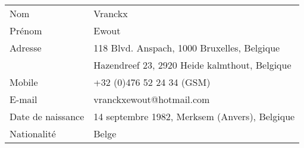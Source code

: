 \documentclass[10pt]{report}
\begin{document}
\pagestyle{headings}
\thispagestyle{empty}

\ \newline







		
\begin{tabular}[t]{ll}

Nom & Vranckx\\[1ex]
Pr\'{e}nom & Ewout\\[1ex]
Adresse & 118 Blvd. Anspach, 1000 Bruxelles, Belgique\\[1ex]
& Hazendreef 23, 2920 Heide kalmthout, Belgique\\[1ex]
Mobile & +32 (0)476 52 24 34 (GSM)\\[1ex]
E-mail & vranckxewout@hotmail.com\\[1ex]
Date de naissance & 14 septembre 1982, Merksem (Anvers), Belgique\\[1ex]
Nationalit\'{e} & Belge\\[1ex]

\end{tabular}
\ \\
\end{document}
